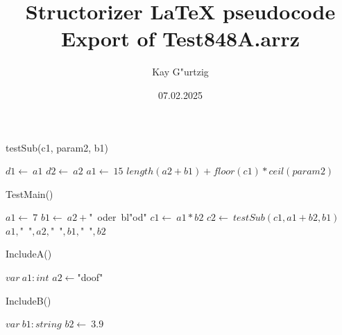 \documentclass[a4paper,10pt]{article}
\title{Structorizer LaTeX pseudocode Export of Test848A.arrz}
\author{Kay G"urtzig}
\date{07.02.2025}
\begin{document}
\begin{algorithm}
\caption{testSub(c1, param2, b1)}
\begin{algorithmic}[5]

  \STATE \(d1\gets\ a1\)
  \STATE \(d2\gets\ a2\)
  \STATE \(a1\gets\ 15\)
  \RETURN\(length(a2 + b1) + floor(c1) * ceil(param2)\)

\end{algorithmic}
\end{algorithm}


\STATE {}


\begin{algorithm}
\caption{TestMain()}
\begin{algorithmic}[5]

\STATE {}
  \STATE \(a1\gets\ 7\)
  \STATE \(b1\gets\ a2+\)"{}\ oder\ bl"od"{}\(\)
  \STATE \(c1\gets\ a1*b2\)
  \STATE \(c2\gets\ testSub(c1,a1+b2,b1)\)
  \PRINT\(a1,\)"{}\ "{}\(,a2,\)"{}\ "{}\(,b1,\)"{}\ "{}\(,b2\)

\end{algorithmic}
\end{algorithm}


\begin{algorithm}
\caption{IncludeA()}
\begin{algorithmic}[5]

  \STATE \(var\ a1:int\)
  \STATE \(a2\gets\)"{}doof"{}\(\)

\end{algorithmic}
\end{algorithm}


\begin{algorithm}
\caption{IncludeB()}
\begin{algorithmic}[5]

  \STATE \(var\ b1:string\)
  \STATE \(b2\gets\ 3.9\)

\end{algorithmic}
\end{algorithm}
\end{document}
